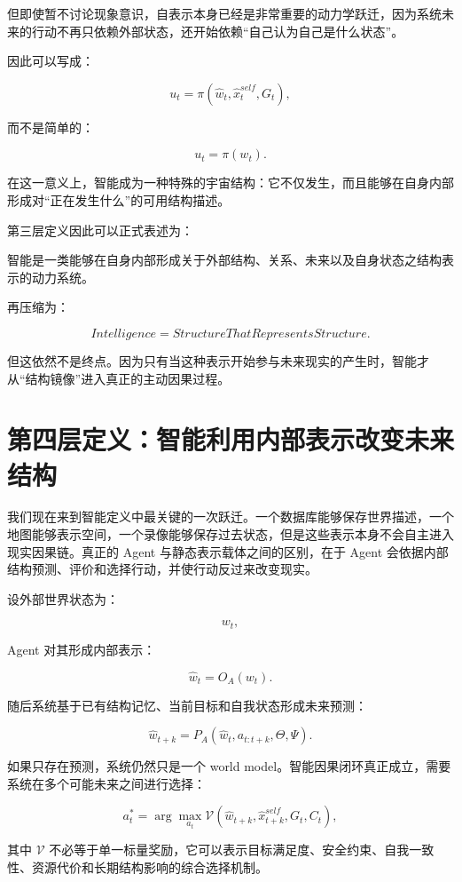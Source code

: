 但即使暂不讨论现象意识，自表示本身已经是非常重要的动力学跃迁，因为系统未来的行动不再只依赖外部状态，还开始依赖“自己认为自己是什么状态”。

因此可以写成：

\[
u_t
=
\pi
\left(
\hat w_t,
\hat x_t^{self},
G_t
\right),
\]

而不是简单的：

\[
u_t
=
\pi(w_t).
\]

在这一意义上，智能成为一种特殊的宇宙结构：它不仅发生，而且能够在自身内部形成对“正在发生什么”的可用结构描述。

第三层定义因此可以正式表述为：

\begin{definition*}
智能是一类能够在自身内部形成关于外部结构、关系、未来以及自身状态之结构表示的动力系统。
\end{definition*}

再压缩为：

\[
\boxed{
Intelligence
=
StructureThatRepresentsStructure.
}
\]

但这依然不是终点。因为只有当这种表示开始参与未来现实的产生时，智能才从“结构镜像”进入真正的主动因果过程。

\section{第四层定义：智能利用内部表示改变未来结构}

我们现在来到智能定义中最关键的一次跃迁。一个数据库能够保存世界描述，一个地图能够表示空间，一个录像能够保存过去状态，但是这些表示本身不会自主进入现实因果链。真正的 Agent 与静态表示载体之间的区别，在于 Agent 会依据内部结构预测、评价和选择行动，并使行动反过来改变现实。

设外部世界状态为：

\[
w_t,
\]

Agent 对其形成内部表示：

\[
\hat w_t
=
O_A(w_t).
\]

随后系统基于已有结构记忆、当前目标和自我状态形成未来预测：

\[
\hat w_{t+k}
=
P_A
\left(
\hat w_t,
a_{t:t+k},
\Theta,
\Psi
\right).
\]

如果只存在预测，系统仍然只是一个 world model。智能因果闭环真正成立，需要系统在多个可能未来之间进行选择：

\[
a_t^*
=
\arg\max_{a_t}
\mathcal V
\left(
\hat w_{t+k},
\hat x_{t+k}^{self},
G_t,
C_t
\right),
\]

其中 \(\mathcal V\) 不必等于单一标量奖励，它可以表示目标满足度、安全约束、自我一致性、资源代价和长期结构影响的综合选择机制。

